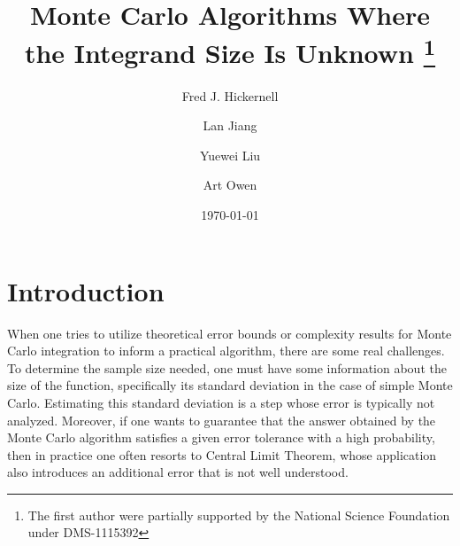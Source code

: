 \documentclass[graybox]{svmult}
\begin{document}
\date{\today}
\title*{Monte Carlo Algorithms Where the Integrand Size Is Unknown
\thanks{The first author were partially supported by the National
Science Foundation under DMS-1115392}}
\author{Fred J. Hickernell \and
Lan Jiang \and Yuewei Liu \and Art Owen }
%
%
\maketitle



\section{Introduction}

When one tries to utilize theoretical error bounds or complexity results for Monte Carlo integration to inform a practical algorithm, there are some real challenges.  To determine the sample size needed, one must have some information about the size of the function, specifically its standard deviation in the case of simple Monte Carlo.  Estimating this standard deviation is a step whose error is typically not analyzed.  Moreover, if one wants to guarantee that the answer obtained by the Monte Carlo algorithm satisfies a given error tolerance with a high probability, then in practice one often resorts to Central Limit Theorem, whose application also introduces an additional error that is not well understood.  
\end{document}
